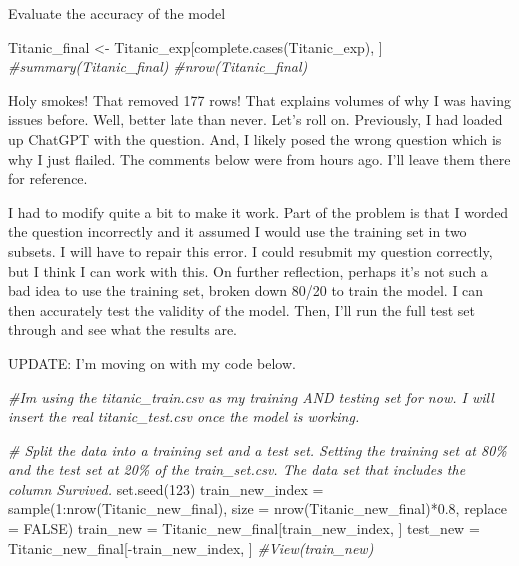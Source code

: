 \documentclass[
  ignorenonframetext,
]{beamer}
\newenvironment{Shaded}{\begin{snugshade}}{\end{snugshade}}
\newcommand{\AttributeTok}[1]{\textcolor[rgb]{0.77,0.63,0.00}{#1}}
\newcommand{\CommentTok}[1]{\textcolor[rgb]{0.56,0.35,0.01}{\textit{#1}}}
\newcommand{\ConstantTok}[1]{\textcolor[rgb]{0.00,0.00,0.00}{#1}}
\newcommand{\DecValTok}[1]{\textcolor[rgb]{0.00,0.00,0.81}{#1}}
\newcommand{\FloatTok}[1]{\textcolor[rgb]{0.00,0.00,0.81}{#1}}
\newcommand{\FunctionTok}[1]{\textcolor[rgb]{0.00,0.00,0.00}{#1}}
\newcommand{\NormalTok}[1]{#1}
\newcommand{\OtherTok}[1]{\textcolor[rgb]{0.56,0.35,0.01}{#1}}
\newcommand{\SpecialCharTok}[1]{\textcolor[rgb]{0.00,0.00,0.00}{#1}}
\begin{document}
\begin{frame}[fragile]{Evaluate the accuracy of the model}
\begin{Shaded}
\begin{Highlighting}[]
\NormalTok{Titanic\_final }\OtherTok{\textless{}{-}}\NormalTok{ Titanic\_exp[}\FunctionTok{complete.cases}\NormalTok{(Titanic\_exp), ]}
\CommentTok{\#summary(Titanic\_final)}
\CommentTok{\#nrow(Titanic\_final)}
\end{Highlighting}
\end{Shaded}

\begin{block}{Holy smokes! That removed 177 rows! That explains volumes
of why I was having issues before. Well, better late than never. Let's
roll on.}
\protect\hypertarget{holy-smokes-that-removed-177-rows-that-explains-volumes-of-why-i-was-having-issues-before.-well-better-late-than-never.-lets-roll-on.}{}
Previously, I had loaded up ChatGPT with the question. And, I likely
posed the wrong question which is why I just flailed. The comments below
were from hours ago. I'll leave them there for reference.

I had to modify quite a bit to make it work. Part of the problem is that
I worded the question incorrectly and it assumed I would use the
training set in two subsets. I will have to repair this error. I could
resubmit my question correctly, but I think I can work with this. On
further reflection, perhaps it's not such a bad idea to use the training
set, broken down 80/20 to train the model. I can then accurately test
the validity of the model. Then, I'll run the full test set through and
see what the results are.

UPDATE: I'm moving on with my code below.

\begin{Shaded}
\begin{Highlighting}[]
\CommentTok{\#I\textquotesingle{}m using the titanic\_train.csv as my training AND testing set for now.  I will insert the real titanic\_test.csv once the model is working.  }

\CommentTok{\# Split the data into a training set and a test set.  Setting the training set at 80\% and the test set at 20\% of the train\_set.csv.  The data set that includes the column Survived.  }
\FunctionTok{set.seed}\NormalTok{(}\DecValTok{123}\NormalTok{)}
\NormalTok{train\_new\_index }\OtherTok{=} \FunctionTok{sample}\NormalTok{(}\DecValTok{1}\SpecialCharTok{:}\FunctionTok{nrow}\NormalTok{(Titanic\_new\_final), }\AttributeTok{size =} \FunctionTok{nrow}\NormalTok{(Titanic\_new\_final)}\SpecialCharTok{*}\FloatTok{0.8}\NormalTok{, }\AttributeTok{replace =} \ConstantTok{FALSE}\NormalTok{)}
\NormalTok{train\_new }\OtherTok{=}\NormalTok{ Titanic\_new\_final[train\_new\_index, ]}
\NormalTok{test\_new }\OtherTok{=}\NormalTok{ Titanic\_new\_final[}\SpecialCharTok{{-}}\NormalTok{train\_new\_index, ]}
\CommentTok{\#View(train\_new)}


\end{Highlighting}
\end{Shaded}
\end{block}
\end{frame}
\end{document}
